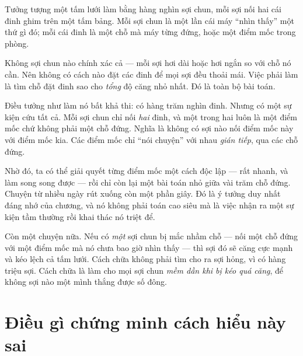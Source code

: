 \documentclass[../../vslam.tex]{subfiles}
\begin{document}
\begin{dongian}
Tưởng tượng một tấm lưới làm bằng hàng nghìn sợi chun, mỗi sợi nối hai cái đinh ghim trên một tấm bảng. Mỗi sợi chun là một lần cái máy ``nhìn thấy'' một thứ gì đó; mỗi cái đinh là một chỗ mà máy từng đứng, hoặc một điểm mốc trong phòng.

Không sợi chun nào chính xác cả --- mỗi sợi hơi dài hoặc hơi ngắn so với chỗ nó cần. Nên không có cách nào đặt các đinh để mọi sợi đều thoải mái. Việc phải làm là tìm chỗ đặt đinh sao cho \emph{tổng} độ căng nhỏ nhất. Đó là toàn bộ bài toán.

Điều tưởng như làm nó bất khả thi: có hàng trăm nghìn đinh. Nhưng có một sự kiện cứu tất cả. Mỗi sợi chun chỉ nối \emph{hai} đinh, và một trong hai luôn là một điểm mốc chứ không phải một chỗ đứng. Nghĩa là không có sợi nào nối điểm mốc này với điểm mốc kia. Các điểm mốc chỉ ``nói chuyện'' với nhau \emph{gián tiếp}, qua các chỗ đứng.

Nhờ đó, ta có thể giải quyết từng điểm mốc một cách độc lập --- rất nhanh, và làm song song được --- rồi chỉ còn lại một bài toán nhỏ giữa vài trăm chỗ đứng. Chuyện từ nhiều ngày rút xuống còn một phần giây. Đó là ý tưởng duy nhất đáng nhớ của chương, và nó không phải toán cao siêu mà là việc nhận ra một sự kiện tầm thường rồi khai thác nó triệt để.

Còn một chuyện nữa. Nếu có \emph{một} sợi chun bị mắc nhầm chỗ --- nối một chỗ đứng với một điểm mốc mà nó chưa bao giờ nhìn thấy --- thì sợi đó sẽ căng cực mạnh và kéo lệch cả tấm lưới. Cách chữa không phải tìm cho ra sợi hỏng, vì có hàng triệu sợi. Cách chữa là làm cho mọi sợi chun \emph{mềm dần khi bị kéo quá căng}, để không sợi nào một mình thắng được số đông.

\end{dongian}

\section{Điều gì chứng minh cách hiểu này sai}
\end{document}
